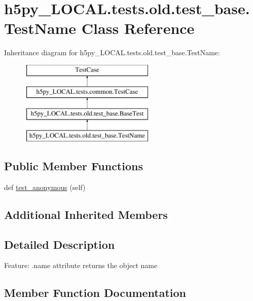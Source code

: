 \hypertarget{classh5py__LOCAL_1_1tests_1_1old_1_1test__base_1_1TestName}{}\section{h5py\+\_\+\+L\+O\+C\+A\+L.\+tests.\+old.\+test\+\_\+base.\+Test\+Name Class Reference}
\label{classh5py__LOCAL_1_1tests_1_1old_1_1test__base_1_1TestName}
Inheritance diagram for h5py\+\_\+\+L\+O\+C\+A\+L.\+tests.\+old.\+test\+\_\+base.\+Test\+Name\+:\begin{figure}[H]
\begin{center}
\leavevmode
\includegraphics[height=4.000000cm]{classh5py__LOCAL_1_1tests_1_1old_1_1test__base_1_1TestName}
\end{center}
\end{figure}
\subsection*{Public Member Functions}
\begin{DoxyCompactItemize}
\item 
def \hyperlink{classh5py__LOCAL_1_1tests_1_1old_1_1test__base_1_1TestName_a1170c9b3add1d10c107aec38f75818cf}{test\+\_\+anonymous} (self)
\end{DoxyCompactItemize}
\subsection*{Additional Inherited Members}


\subsection{Detailed Description}
\begin{DoxyVerb}    Feature: .name attribute returns the object name
\end{DoxyVerb}
 

\subsection{Member Function Documentation}
\mbox{\label{classh5py__LOCAL_1_1tests_1_1old_1_1test__base_1_1TestName_a1170c9b3add1d10c107aec38f75818cf}} 
